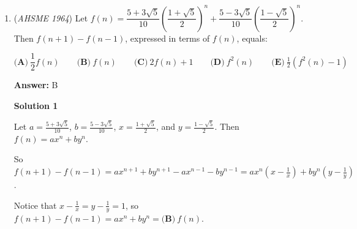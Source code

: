 \begin{enumerate}
 $(4+4\sqrt{3}+3)x^2+(2+\sqrt{3})x-2=0$
$(2+\sqrt{3})^2x^2+(2+\sqrt{3})x-2=0$

 Substituting $u = (2+\sqrt{3})x$,

 $\quad u^2+u-2=0$
$\quad (u-1)(u+2)=0$
$\quad u=1$ or $u=-2$

 First root of $x$:

 $\quad (2+\sqrt{3})x_1=1$
$\quad x_1=\frac{1}{2+\sqrt{3}}$
$\quad x_1=2-\sqrt{3}$

 Second root of $x$:

 $\quad (2+\sqrt{3})x_2=-2$
$\quad x_2=\frac{-2}{2+\sqrt{3}}$
$\quad x_2=-2(2-\sqrt{3})$
$\quad x_2=-4+2\sqrt{3}$

 Now, to find which root of $x$ is larger:

 Assume that

 $\quad 2-\sqrt{3}>-4+2\sqrt{3}$, and so

 $\quad 6>3\sqrt{3}$
$\quad 2>\sqrt{3}$
$\quad \sqrt{4}>\sqrt{3}$ which is true. Hence, $x_1>x_2$.

 Finally, finding the difference between the larger and smaller roots of $x$:

 $\quad x_1-x_2$
$\quad =(2-\sqrt{3})-(-4+2\sqrt{3})$
$\quad =6-3\sqrt{3}$

 Therefore, the answer is $\boxed{\textbf{(D)}}$.

 


	\item (\textit{AHSME 1964}) Let $f(n)=\dfrac{5+3\sqrt{5}}{10}\left(\dfrac{1+\sqrt{5}}{2}\right)^n+\dfrac{5-3\sqrt{5}}{10}\left(\dfrac{1-\sqrt{5}}{2}\right)^n$. 
Then $f(n+1)-f(n-1)$, expressed in terms of $f(n)$, equals:


 $\textbf{(A)}\ \dfrac{1}{2}f(n) \qquad \textbf{(B)}\ f(n)\qquad \textbf{(C)}\ 2f(n)+1 \qquad \textbf{(D)}\ f^2(n)\qquad \textbf{(E)}\ \frac{1}{2}(f^2(n)-1)$

 \textbf{Answer: }B



\textbf{Solution 1}

Let $a = \frac{5+3\sqrt{5}}{10}$, $b = \frac{5-3\sqrt{5}}{10}$, $x =\frac{1+\sqrt{5}}{2}$, and $y = \frac{1-\sqrt{5}}{2}$.  Then $f(n) = ax^n + by^n$.  

 So $f(n+1) - f(n-1) = ax^{n+1} + by^{n+1} - ax^{n-1} - by^{n-1} = ax^n \left(x-\frac{1}{x}\right) + by^n \left(y - \frac{1}{y}\right)$.

 Notice that $x - \frac{1}{x} = y - \frac{1}{y} = 1$, so $f(n+1) - f(n-1) = ax^n + by^n = \boxed{\textbf{(B)}\ f(n)}$.


\end{enumerate}
